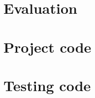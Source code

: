 \documentclass[a4paper]{article}
\numberwithin{figure}{subsection}
\numberwithin{equation}{subsection}
\begin{document}
\newpage



\newpage

\section{Evaluation\label{evaluation}}




\newpage


\printbibliography

\label{last_document_page}



\clearpage

\appendix

\cfoot{\thepage}

\section{Project code\label{appendix:project-code}}


\newpage

\section{Testing code\label{appendix:testing-code}}


\end{document}
